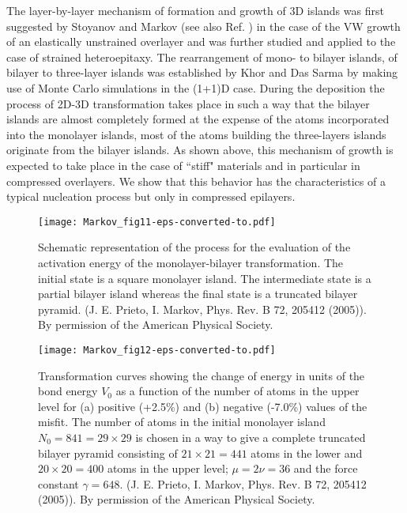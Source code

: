 \documentclass[aps,prl,showpacs,twocolumn,byrevtex,floatfix]{revtex4-1}
\begin{document}
The layer-by-layer mechanism of formation and growth of 3D islands was first
suggested by Stoyanov and Markov\cite{Stoyanov82} (see also Ref.
) in the case of the VW growth of an elastically
unstrained overlayer and was further studied and applied to the case of
strained heteroepitaxy.\cite{Khor00,Korutcheva00,Prieto05,Xiang10} The
rearrangement of mono- to bilayer islands, of bilayer to three-layer islands
was established by Khor and Das Sarma by making use of Monte Carlo simulations
in the (1+1)D case. During the deposition the process of 2D-3D transformation
takes place in such a way that the bilayer islands are almost completely formed
at the expense of the atoms incorporated into the monolayer islands, most of
the atoms building the three-layers islands originate from the bilayer islands.
\cite{Khor00} As shown above, this mechanism of growth is expected to take place
in the case of ``stiff" materials and in particular in compressed overlayers. We
show that this behavior has the characteristics of a typical nucleation process
but only in compressed epilayers.

\begin{figure}[htb]
\texttt{[image: Markov\_fig11-eps-converted-to.pdf]}
\caption{\label{transform} Schematic representation of the process for the
evaluation of the activation energy of the monolayer-bilayer transformation. The
initial state is a square monolayer island. The intermediate state is a partial
bilayer island whereas the final state is a truncated bilayer pyramid. (J. E.
Prieto, I. Markov, Phys. Rev. B 72, 205412 (2005)). By permission of the
American Physical Society.}
\end{figure}

\begin{figure}[htb]
\texttt{[image: Markov\_fig12-eps-converted-to.pdf]}
\caption{\label{transcurves} Transformation curves showing the change
of energy in units of the bond energy $V_0$ as a function of the number
of atoms in the upper level for (a) positive (+2.5\%) and (b) negative (-7.0\%)
values of the misfit. The number of atoms in the initial monolayer island
$N_0=841=29 \times 29$ is chosen in a way to give a complete truncated bilayer
pyramid consisting of $21 \times 21=441$ atoms in the lower and $20 \times
20=400$ atoms in the upper level; $\mu =2\nu =36$ and the force constant $\gamma
= 648$. (J. E. Prieto, I. Markov, Phys. Rev. B 72, 205412 (2005)). By permission
of the American Physical Society.}
\end{figure}
\end{document}
